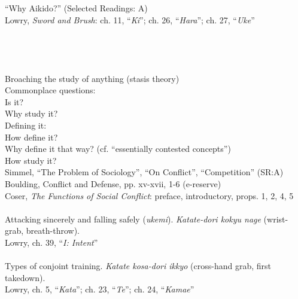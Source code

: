 \indent ``Why Aikido?'' (Selected Readings: A) \\
\indent Lowry, \emph{Sword and Brush}: ch. 11, ``\emph{Ki}''; ch. 26, ``\emph{Hara}''; ch. 27, ``\emph{Uke}'' \\
 \\
 \\
 \\
 \\
\indent Broaching the study of anything (stasis theory) \\
\indent Commonplace questions: \\
\indent \indent \indent Is it? \\
\indent \indent \indent Why study it? \\
\indent \indent \indent Defining it: \\
\indent \indent \indent \indent How define it? \\
\indent \indent \indent \indent Why define it that way? (cf. ``essentially contested concepts'') \\
\indent \indent \indent How study it? \\
\indent Simmel, ``The Problem of Sociology'', ``On Conflict'', ``Competition'' (SR:A) \\
\indent Boulding, Conflict and Defense, pp. xv-xvii, 1-6 (e-reserve) \\
\indent Coser, \emph{The Functions of Social Conflict}: preface, introductory, props. 1, 2, 4, 5 \\
 \\
\indent Attacking sincerely and falling safely (\emph{ukemi}). \emph{Katate-dori kokyu nage} (wrist-grab, breath-throw).  \\
\indent Lowry, ch. 39, ``\emph{I: Intent}'' \\
 \\
\indent Types of conjoint training. \emph{Katate kosa-dori ikkyo} (cross-hand grab, first takedown). \\
\indent Lowry, ch. 5, ``\emph{Kata}''; ch. 23, ``\emph{Te}''; ch. 24, ``\emph{Kamae}'' \\
 \\
 \\
 \\
 \\
